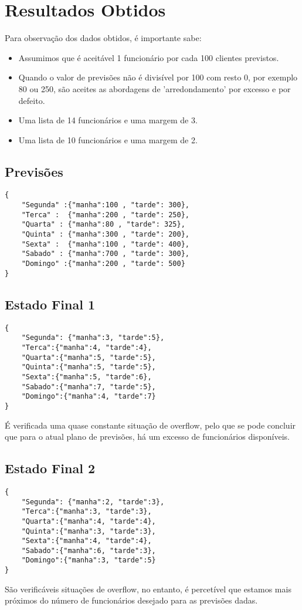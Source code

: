 \section{Resultados Obtidos}

Para observação dos dados obtidos, é importante sabe:

\begin{itemize}
    \item Assumimos que é aceitável 1 funcionário por cada 100 clientes previstos.
    \item Quando o valor de previsões não é divisível por 100 com resto 0, por exemplo 80 ou 250, são aceites as abordagens de 'arredondamento' por excesso e por defeito.
    \item Uma lista de 14 funcionários e uma margem de 3.
    \item Uma lista de 10 funcionários e uma margem de 2.
\end{itemize}

\subsection*{ Previsões}

\begin{lstlisting}
{
    "Segunda" :{"manha":100 , "tarde": 300},
    "Terca" :  {"manha":200 , "tarde": 250},
    "Quarta" : {"manha":80 , "tarde": 325},
    "Quinta" : {"manha":300 , "tarde": 200},
    "Sexta" :  {"manha":100 , "tarde": 400},
    "Sabado" : {"manha":700 , "tarde": 300},
    "Domingo" :{"manha":200 , "tarde": 500}
}
\end{lstlisting}

\subsection*{ Estado Final 1 }

\begin{lstlisting}
{
    "Segunda": {"manha":3, "tarde":5},
    "Terca":{"manha":4, "tarde":4},
    "Quarta":{"manha":5, "tarde":5},
    "Quinta":{"manha":5, "tarde":5},
    "Sexta":{"manha":5, "tarde":6},
    "Sabado":{"manha":7, "tarde":5},
    "Domingo":{"manha":4, "tarde":7}
}
\end{lstlisting}

 É verificada uma quase constante situação de overflow, pelo que se pode concluir que para o atual plano de previsões, há um excesso de funcionários disponíveis. 

\subsection*{ Estado Final 2}

\begin{lstlisting}
{
    "Segunda": {"manha":2, "tarde":3},
    "Terca":{"manha":3, "tarde":3},
    "Quarta":{"manha":4, "tarde":4},
    "Quinta":{"manha":3, "tarde":3},
    "Sexta":{"manha":4, "tarde":4},
    "Sabado":{"manha":6, "tarde":3},
    "Domingo":{"manha":3, "tarde":5}
}
\end{lstlisting}

São verificáveis situações de overflow, no  entanto, é percetível que estamos mais próximos do número de funcionários desejado para as previsões dadas.